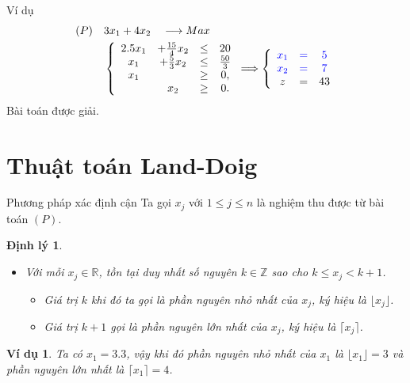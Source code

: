 \documentclass[10pt]{beamer}
\newtheorem{dl}{Định lý}[section]
\newtheorem{vd}{Ví dụ}[section]
\begin{document}
\begin{frame}{Ví dụ}
    \begin{equation} \label{baitoannguyenhet}
    \begin{split}
        (P) \quad & 3x_1 + 4x_2 \quad \longrightarrow Max \\
        & \left\{\begin{array} {cccc}
        2.5x_1 &+ \frac{15}{4}x_2 &\leq& 20 \\
        x_1 &+ \frac{5}{3}x_2 &\leq& \frac{50}{3} \\
        x_1 &&\geq &0, \\
        &x_2 &\geq& 0. \\
        \end{array}\right.
        \Longrightarrow
        \left\{\begin{array}{ccc}
        \color{blue} x_1 &\color{blue} = &\color{blue} 5 \\
        \color{blue} x_2 &\color{blue} = & \color{blue} 7 \\
        z& =&43
    \end{array}\right.
    \end{split}
    \end{equation}
    \vspace{0.5cm}
    \center
    \Large
    Bài toán được giải.
\end{frame}

\section*{Thuật toán Land-Doig}

\begin{frame}{Phương pháp xác định cận}
Ta gọi $x_j$ với $1 \leq j \leq n$ là nghiệm thu được từ bài toán $(P)$.
\begin{dl}\label{cmnguyen}
\begin{itemize}
\item Với mỗi $x_j \in \mathbb{R}$, tồn tại duy nhất số nguyên $k \in \mathbb{Z}$ sao cho $k \leq x_j < k+1$.
\begin{itemize}
\item Giá trị $k$ khi đó ta gọi là phần nguyên nhỏ nhất của $x_j$, ký hiệu là $\lfloor x_j \rfloor$.
\item Giá trị $k+1$ gọi là phần nguyên lớn nhất của $x_j$, ký hiệu là $\lceil x_j \rceil$.
\end{itemize}
\end{itemize}
\end{dl}
\bigskip
\begin{vd}
Ta có $x_1=3.3$, vậy khi đó phần nguyên nhỏ nhất của $x_1$ là $\lfloor x_1 \rfloor = 3$ và phần nguyên lớn nhất là $\lceil x_1 \rceil =4$.
\end{vd}
\end{frame}
\end{document}

